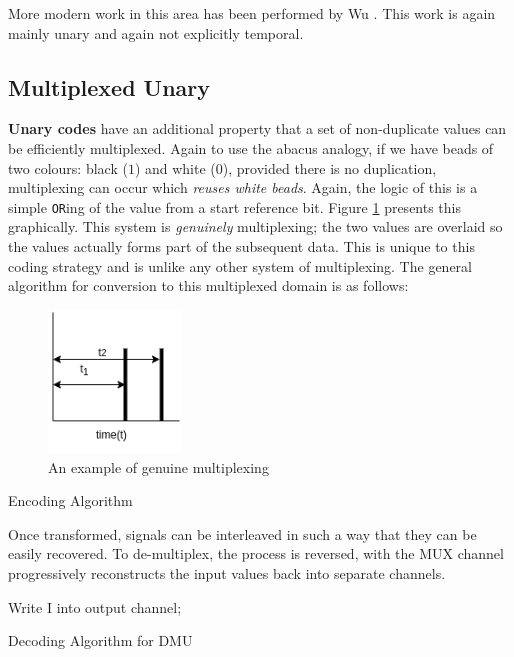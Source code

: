 \documentclass{article}
\begin{document}
More modern work in this area has been performed by Wu \cite{wu2020ugemm} \cite{pan2022t} \cite{wu2022usystolic}. This work is again mainly unary and again not explicitly temporal.

\subsection{Multiplexed Unary}

\textbf{Unary codes} have an additional property that a set of non-duplicate values can be efficiently multiplexed. Again to use the abacus analogy, if we have beads of two colours: black ($1$) and white ($0$), provided there is no duplication, multiplexing can occur which \textit{reuses white beads}. Again, the logic of this is a simple \texttt{OR}ing of the value from a start reference bit. Figure \ref{fig:mul1} presents this graphically. This system is \emph{genuinely} multiplexing; the two values are overlaid so the values actually forms part of the subsequent data. This is unique to this coding strategy and is unlike any other system of multiplexing. The general algorithm for conversion to this multiplexed domain is as follows:


\begin{figure}
	\centerline{\includegraphics[width=100pt]{figures/multiplex.png}}
	\caption{An example of genuine multiplexing}\label{fig:mul1}
\end{figure}

\begin{algorithm}
	\SetAlgoLined %
	\caption{Encoding Algorithm}
\end{algorithm}

Once transformed, signals can be interleaved in such a way that they can be easily recovered. To de-multiplex, the process is reversed, with the MUX channel progressively reconstructs the input values back into separate channels.

\begin{algorithm}
	\SetAlgoLined %
	 {
		 {
				Write I into output channel;
			}
	}
	\caption{Decoding Algorithm for DMU}
\end{algorithm}
\end{document}

